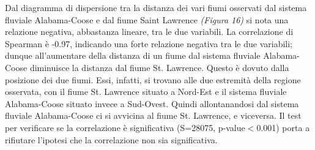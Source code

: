 \documentclass{article} %
\begin{document}
Dal diagramma di dispersione tra la distanza dei vari fiumi osservati dal sistema fluviale Alabama-Coose e dal fiume Saint Lawrence \textit{(Figura 16)} si nota una relazione negativa, abbastanza lineare, tra le due variabili.  
La correlazione di Spearman è -0.97, indicando una forte relazione negativa tra le due variabili; dunque all'aumentare della distanza di un fiume dal sistema fluviale Alabama-Coose diminuisce la distanza dal fiume St. Lawrence. 
Questo è dovuto dalla posizione dei due fiumi. Essi, infatti, si trovano alle due estremità della regione osservata, con il fiume St. Lawrence situato a Nord-Est e il sistema fluviale Alabama-Coose situato invece a Sud-Ovest. Quindi allontanandosi dal sistema fluviale Alabama-Coose ci si avvicina al fiume St. Lawrence, e viceversa.
Il test per verificare se la correlazione è significativa (S=28075, p-value$<$0.001) porta a rifiutare l'ipotesi che la correlazione non sia significativa.
\end{document}
